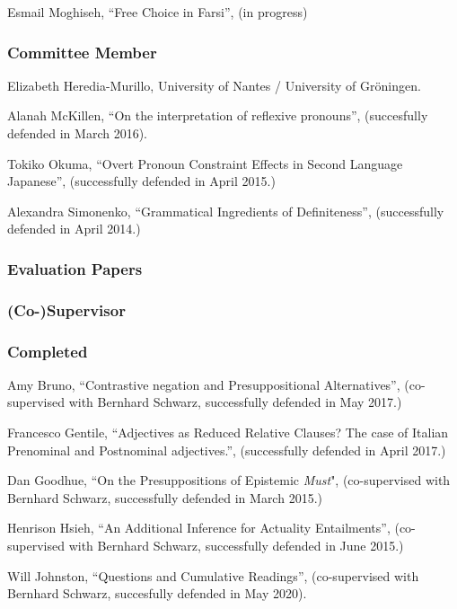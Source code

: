 \documentclass[11pt]{article}
\begin{document}
Esmail Moghiseh, ``Free Choice in Farsi'', (in progress)

\vspace{-10pt}

\subsubsection*{Committee Member}

Elizabeth Heredia-Murillo, University of Nantes / University of Gr\"{o}ningen.

Alanah McKillen, ``On the interpretation of reflexive pronouns'', (succesfully defended in March 2016).

Tokiko Okuma, ``Overt Pronoun Constraint Effects in Second Language Japanese'', (successfully defended in April 2015.)

Alexandra Simonenko, ``Grammatical Ingredients of Definiteness'',
(successfully defended in April 2014.)
\vspace{-10pt}


\subsubsection*{Evaluation Papers}

\subsubsection*{(Co-)Supervisor}

\subsubsection*{Completed}


Amy Bruno, ``Contrastive negation and Presuppositional Alternatives'', (co-supervised with Bernhard Schwarz, successfully defended in May 2017.)

Francesco Gentile, ``Adjectives as Reduced Relative Clauses?
The case of Italian Prenominal and Postnominal adjectives.'', (successfully defended in April  2017.)

Dan Goodhue, ``On the Presuppositions of Epistemic \textit{Must}", (co-supervised with Bernhard Schwarz, successfully defended in March 2015.)

Henrison Hsieh, ``An Additional Inference for Actuality Entailments'',
(co-supervised with Bernhard Schwarz, successfully defended in June 2015.)

Will Johnston, ``Questions and Cumulative Readings'', (co-supervised with Bernhard Schwarz, succesfully defended in May 2020).
\end{document}
